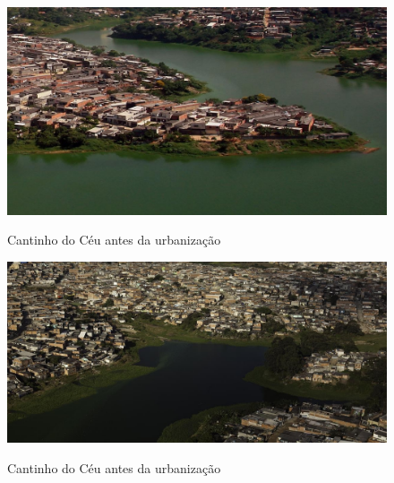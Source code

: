 	\begin{figure}[hb]
		\centering
		\caption{Cantinho do Céu antes da urbanização}
		\includegraphics[width=\linewidth]{img/knoll_antes02}
		\label{fig:fotos_antes_02}
	\end{figure}
	
	\begin{figure}[htb]
		\centering
		\caption{Cantinho do Céu antes da urbanização}
		\includegraphics[width=\linewidth]{img/knoll_antes03}
		\label{fig:fotos_antes_03}
	\end{figure}

